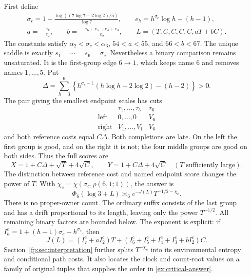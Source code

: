 First define
\begin{gather}
 \sigma_c=1-\frac{\log((7\log7-2\log2)/5)}{\log7},\qquad
 e_h=h^{\sigma_c}\log h-(h-1),
 \label{ex:critical-constants}\\
 a=-\frac{e_7}{e_2},\qquad
 b=-\frac{e_6+e_5+e_4+e_3}{e_2},\qquad
 L=(T,C,C,C,C,aT+bC).
 \label{ex:critical-lengths}
\end{gather}
The constants satisfy \(\alpha_2<\sigma_c<\alpha_3\), \(54<a<55\),
and \(66<b<67\).  The unique saddle is exactly
\(s_1=\cdots=s_6=\sigma_c\).  Nevertheless a binary comparison remains
unsaturated.  It is the first-group edge \(6\to1\), which keeps name
\(6\) and removes names \(1,\ldots,5\).  Put
\[
 \Delta=\sum_{h=3}^6
 \left\{h^{\sigma_c-1}(h\log h-2\log2)-(h-2)\right\}>0.
\]
The pair giving the smallest endpoint scales has cuts
\[
\begin{array}{c|cc}
 &\tau_1,\ldots,\tau_5&\tau_6\\ \hline
 \text{left}&0,\ldots,0&V_6\\
 \text{right}&V_1,\ldots,V_1&V_6
\end{array}
\]
and both reference costs equal \(C\Delta\).  Both completions are late.
On the left the first group is good, and on the right it is not; the four
middle groups are good on both sides.  Thus the full scores are
\begin{equation}
 X=1+C\Delta+\sqrt T+4\sqrt C,\qquad
 Y=1+C\Delta+4\sqrt C
 \quad (T\text{ sufficiently large}).
 \label{ex:critical-endpoints}
\end{equation}
The distinction between reference cost and named endpoint score changes
the power of \(T\).  With
\(\chi_c=\chi(\sigma_c,\rho(6,1;1))\), the answer is
\begin{equation}
 \Phi_6(\log3+L)\asymp_6
       e^{-J(L)}T^{-1/2-\chi_c}.
 \label{ex:critical-answer}
\end{equation}
There is no proper-owner count.  The ordinary suffix consists of the
last group and has a drift proportional to its length, leaving only
the power \(T^{-1/2}\).  All remaining binary factors are bounded below.
The exponent is explicit: if
\(I_h^{c}=1+(h-1)\sigma_c-h^{\sigma_c}\), then
\[
J(L)=(I_7^{c}+aI_2^{c})T+
             (I_6^{c}+I_5^{c}+I_4^{c}+I_3^{c}+bI_2^{c})C.
\]
Section~\ref{fp:sec:interpretation} further splits $T^{-\chi_c}$
into its environmental entropy and conditional path costs. It also
locates the clock and count-root values on a family of original tuples
that supplies the order in \eqref{ex:critical-answer}.

